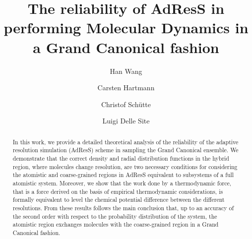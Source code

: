 \documentclass[aip,jcp,a4paper,reprint,onecolumn]{revtex4-1}
\begin{document}
\title{The reliability of AdResS in performing  Molecular Dynamics in a Grand Canonical fashion}
\author{Han Wang}
\author{Carsten Hartmann}
\author{Christof Sch\"utte}
\author{Luigi Delle Site}

\begin{abstract}
  In this work, we provide a detailed theoretical analysis of the
  reliability of the adaptive resolution simulation (AdResS) scheme in sampling the Grand Canonical
  ensemble. We demonstrate that the correct density and radial distribution
  functions in the hybrid region, where molecules change resolution, are two necessary conditions for
  considering the atomistic and coarse-grained regions in AdResS equivalent to subsystems
  of a full atomistic system.  Moreover, we show that the
  work done by a thermodynamic force, that is a force derived on the basis of empirical thermodynamic considerations, is formally equivalent to level the chemical
  potential difference between the different resolutions. From these results follows the main conclusion that,
  up to an accuracy of the second order with respect to the probability distribution of the system, the atomistic region exchanges
  molecules with the coarse-grained region in a Grand Canonical
  fashion.
\end{abstract}

\maketitle
\end{document}
